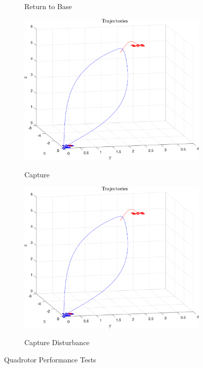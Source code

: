 \documentclass{article}
\begin{document}
\begin{multicols}{2}
\begin{figure}[H]
\begin{subfigure}[b]{0.49\columnwidth}
      \caption{Return to Base}
 \end{subfigure}
\begin{subfigure}[b]{0.49\columnwidth}
    \centering
    \includegraphics[width = 1\textwidth]{images/Intercept.png}
     \label{fig:Capture}
     \vspace{-5mm}
     \caption{Capture}
 \end{subfigure}
 \begin{subfigure}[b]{0.49\columnwidth}
    \centering
    \includegraphics[width = 1\textwidth]{images/Intercept.png}
     \label{fig:CaptureW}
     \vspace{-5mm}
     \caption{Capture Disturbance}
 \end{subfigure}
   \caption{Quadrotor Performance Tests}
\end{figure}


\end{multicols}
\end{document}
